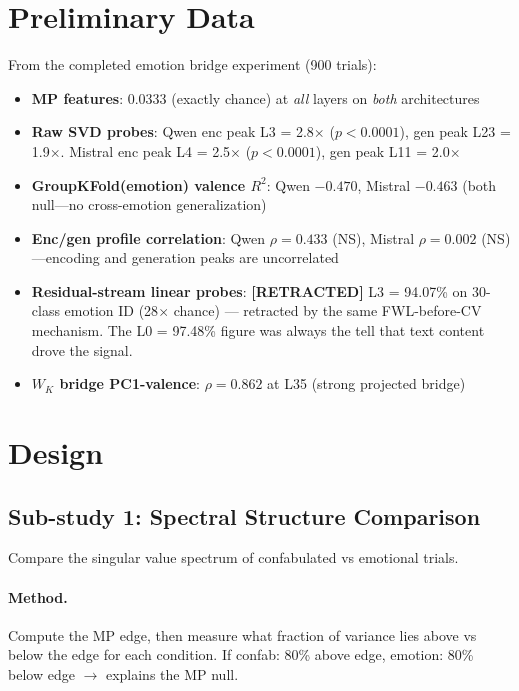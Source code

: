 \documentclass[11pt,letterpaper]{article}
\begin{document}
\section{Preliminary Data}

From the completed emotion bridge experiment (900 trials):

\begin{itemize}
  \item \textbf{MP features}: 0.0333 (exactly chance) at \emph{all}
    layers on \emph{both} architectures
  \item \textbf{Raw SVD probes}: Qwen enc peak L3 = 2.8$\times$ ($p <
    0.0001$), gen peak L23 = 1.9$\times$. Mistral enc peak L4 =
    2.5$\times$ ($p < 0.0001$), gen peak L11 = 2.0$\times$
  \item \textbf{GroupKFold(emotion) valence $R^2$}: Qwen $-0.470$,
    Mistral $-0.463$ (both null---no cross-emotion generalization)
  \item \textbf{Enc/gen profile correlation}: Qwen $\rho = 0.433$
    (NS), Mistral $\rho = 0.002$ (NS)---encoding and generation peaks
    are uncorrelated
  \item \textbf{Residual-stream linear probes}: \textbf{[RETRACTED]} L3 = 94.07\% on
    30-class emotion ID (28$\times$ chance) --- retracted by the same
    FWL-before-CV mechanism. The L0 = 97.48\% figure was always the tell that text
    content drove the signal.
  \item \textbf{$W_K$ bridge PC1-valence}: $\rho = 0.862$ at L35
    (strong projected bridge)
\end{itemize}

\section{Design}

\subsection*{Sub-study 1: Spectral Structure Comparison}

Compare the singular value spectrum of confabulated vs emotional trials.

\paragraph{Method.} Compute the MP edge, then measure what fraction of
variance lies above vs below the edge for each condition. If confab:
80\% above edge, emotion: 80\% below edge $\rightarrow$ explains the
MP null.
\end{document}
